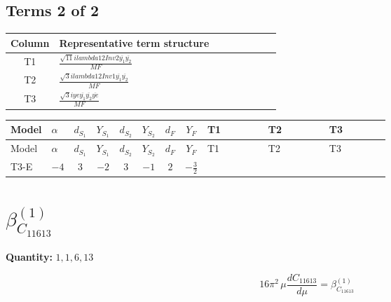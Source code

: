\documentclass[8pt]{article}
\begin{document}
\begin{landscape}
\subsection*{Terms 2 of 2}
\begin{center}
\begin{tabular}{@{}c >{\raggedright\arraybackslash}p{0.82\linewidth}@{}}
\toprule
Column & Representative term structure \\
\midrule
T1 & \(\displaystyle \frac{\sqrt{11} i lambda12Inv2 \overline{y_{1}} \overline{y_{2}}}{MF}\) \\
\midrule
T2 & \(\displaystyle \frac{\sqrt{3} i lambda12Inv1 \overline{y_{1}} \overline{y_{2}}}{MF}\) \\
\midrule
T3 & \(\displaystyle \frac{\sqrt{3} i ye \overline{y_{1}} \overline{y_{2}} \overline{ye}}{MF}\) \\
\midrule
\bottomrule
\end{tabular}
\end{center}
\smallskip
\tiny
\begin{longtable}{@{}llcccccc >{\raggedright\arraybackslash}p{0.21\linewidth} >{\raggedright\arraybackslash}p{0.21\linewidth} >{\raggedright\arraybackslash}p{0.21\linewidth}@{}}
\toprule
Model & $\alpha$ & $d_{S_1}$ & $Y_{S_1}$ & $d_{S_2}$ & $Y_{S_2}$ & $d_F$ & $Y_F$ & T1 & T2 & T3 \\
\midrule
\endfirsthead
\toprule
Model & $\alpha$ & $d_{S_1}$ & $Y_{S_1}$ & $d_{S_2}$ & $Y_{S_2}$ & $d_F$ & $Y_F$ & T1 & T2 & T3 \\
\midrule
\endhead
T3-E & $-4$ & $3$ & $-2$ & $3$ & $-1$ & $2$ & $-\frac{3}{2}$ & \scriptsize\adjustbox{max width=\linewidth}{$\begin{gathered} - \frac{3 \sqrt{11} i lambda12Inv2 \overline{y_{1}} \overline{y_{2}}}{22 MF}\end{gathered}$} & \scriptsize\adjustbox{max width=\linewidth}{$\begin{gathered} \frac{\sqrt{3} i lambda12Inv1 \overline{y_{1}} \overline{y_{2}}}{6 MF}\end{gathered}$} & \scriptsize\adjustbox{max width=\linewidth}{$\begin{gathered} \frac{\sqrt{3} i ye \overline{y_{1}} \overline{y_{2}} \overline{ye}}{12 MF}\end{gathered}$} \\
\midrule
\bottomrule
\end{longtable}
\clearpage
\section*{$\beta_{C_{11613}}^{(1)}$}
\noindent\textbf{Quantity: }$\mathrm{1,1,6,13}$\par\smallskip
\[16\pi^2\,\mu\frac{d C_{11613}}{d\mu}=\beta_{C_{11613}}^{(1)}\]

\end{landscape}
\end{document}
